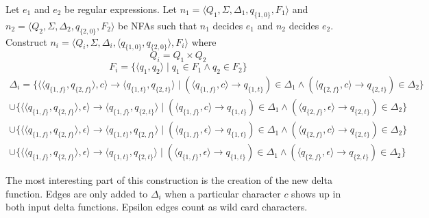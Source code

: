 Let $e_1$ and $e_2$ be regular expressions. Let
$n_1 = \langle Q_1, \Sigma, \Delta_1, q_{\{1,0\}}, F_1 \rangle$ and
$n_2 = \langle Q_2, \Sigma, \Delta_2, q_{\{2,0\}}, F_2 \rangle$
be NFAs such that $n_1$ decides $e_1$ and $n_2$ decides $e_2$.
Construct $n_i = \langle Q_i, \Sigma, \Delta_i, \langle q_{\{1,0\}}, q_{\{2,0\}} \rangle, F_i \rangle$
where
$$Q_i = Q_1 \times Q_2$$
$$F_i = \{ \langle q_1, q_2 \rangle \mid q_1 \in F_1 \wedge q_2 \in F_2\}$$
\begin{equation}
\begin{split}
  \Delta_i = \{ \langle \langle q_{\{1, f\}}, q_{\{2, f\}} \rangle, c \rangle
                    \rightarrow \langle q_{\{1, t\}}, q_{\{2, t\}} \rangle
                \mid
                  (\langle q_{\{1, f\}}, c \rangle \rightarrow q_{\{1, t\}}) \in \Delta_1
                  \wedge
                  (\langle q_{\{2, f\}}, c \rangle \rightarrow q_{\{2, t\}}) \in \Delta_2
             \} \\
             \cup
             \{
                \langle \langle q_{\{1, f\}}, q_{\{2, f\}} \rangle, \epsilon \rangle
                  \rightarrow \langle q_{\{1, f\}}, q_{\{2, t\}} \rangle
                \mid
                  (\langle q_{\{1, f\}}, c \rangle \rightarrow q_{\{1, t\}}) \in \Delta_1
                  \wedge
                  (\langle q_{\{2, f\}}, \epsilon \rangle \rightarrow q_{\{2, t\}}) \in \Delta_2
             \} \\
             \cup
             \{
                \langle \langle q_{\{1, f\}}, q_{\{2, f\}} \rangle, \epsilon \rangle
                  \rightarrow \langle q_{\{1, t\}}, q_{\{2, f\}} \rangle
                \mid
                  (\langle q_{\{1, f\}}, \epsilon \rangle \rightarrow q_{\{1, t\}}) \in \Delta_1
                  \wedge
                  (\langle q_{\{2, f\}}, c \rangle \rightarrow q_{\{2, t\}}) \in \Delta_2
             \} \\
             \cup
             \{
                \langle \langle q_{\{1, f\}}, q_{\{2, f\}} \rangle, \epsilon \rangle
                  \rightarrow \langle q_{\{1, t\}}, q_{\{2, t\}} \rangle
                \mid
                  (\langle q_{\{1, f\}}, \epsilon \rangle \rightarrow q_{\{1, t\}}) \in \Delta_1
                  \wedge
                  (\langle q_{\{2, f\}}, \epsilon \rangle \rightarrow q_{\{2, t\}}) \in \Delta_2
             \}
\end{split}
\end{equation}

The most interesting part of this construction is the creation of the
new delta function. Edges are only added to $\Delta_i$ when a particular
character $c$ shows up in both input delta functions. Epsilon edges count
as wild card characters.

